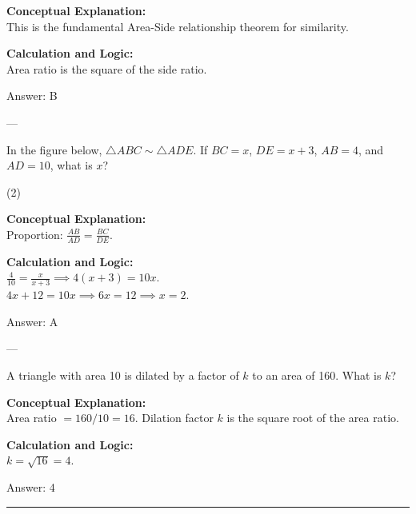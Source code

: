 \documentclass[11pt,paper=a4,answers]{exam}
\begin{document}
\begin{questions}
\begin{solution}
\textbf{Conceptual Explanation:} \\
This is the fundamental Area-Side relationship theorem for similarity.

\vspace{10pt}
\textbf{Calculation and Logic:} \\
Area ratio is the square of the side ratio.

\vspace{15pt}
Answer: \colorbox{yellow!100}{B}
\end{solution}

---

\question
In the figure below, $\triangle ABC \sim \triangle ADE$. If $BC = x$, $DE = x+3$, $AB = 4$, and $AD = 10$, what is $x$?
\begin{tasks}(2)
\end{tasks}

\begin{solution}
\textbf{Conceptual Explanation:} \\
Proportion: $\frac{AB}{AD} = \frac{BC}{DE}$.

\vspace{10pt}
\textbf{Calculation and Logic:} \\
$\frac{4}{10} = \frac{x}{x+3} \implies 4(x+3) = 10x$. \\
$4x + 12 = 10x \implies 6x = 12 \implies x = 2$.

\vspace{15pt}
Answer: \colorbox{yellow!100}{A}
\end{solution}

---

\question
A triangle with area 10 is dilated by a factor of $k$ to an area of 160. What is $k$?

\begin{solution}
\textbf{Conceptual Explanation:} \\
Area ratio $= 160/10 = 16$. Dilation factor $k$ is the square root of the area ratio.

\vspace{10pt}
\textbf{Calculation and Logic:} \\
$k = \sqrt{16} = 4$.

\vspace{15pt}
Answer: \colorbox{yellow!100}{4}
\end{solution}





\end{questions}
\begin{center}
\rule{.5\textwidth}{1pt}
\end{center}
\end{document}
